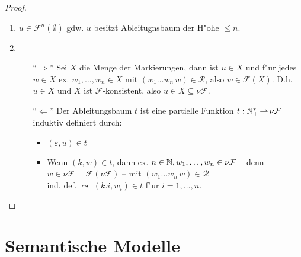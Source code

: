 \documentclass[12pt,a4paper,final]{article}
\begin{document}
\begin{proof} \
  \begin{enumerate}
  \item $u \in \mathcal{F}^n(\emptyset)$ gdw. $u$ besitzt Ableitugnsbaum der H"ohe $\le n$.
  \item 
    \begin{itemize}
    \item[``$\Rightarrow$'']
      Sei $X$ die Menge der Markierungen, dann ist $u \in X$ und f"ur jedes $w \in X$ ex.
      $w_1,\ldots,w_n \in X$ mit $(w_1 \ldots w_n\,w) \in \mathcal{R}$, also
      $w \in \mathcal{F}(X)$. D.h.\xspace $u \in X$ und $X$ ist $\mathcal{F}$-konsistent, also
      $u \in X \subseteq \nu \mathcal{F}$.
    \item[``$\Leftarrow$'']
      Der Ableitungsbaum $t$ ist eine partielle Funktion $t: \mathbb N_+^* \operatorname{\rightharpoonup} \nu\mathcal{F}$ induktiv definiert
      durch:
      \begin{itemize}
      \item $(\varepsilon,u) \in t$
      \item Wenn $(k,w) \in t$, dann ex. $n\in\mathbb N,w_1,\ldots,w_n \in \nu\mathcal{F}$ --
        denn $w \in \nu\mathcal{F} = \mathcal{F}(\nu\mathcal{F})$ -- mit
        $(w_1 \ldots w_n\,w) \in \mathcal{R}$ \\
        ind. def. $\leadsto$ $(k.i,w_i) \in t$ f"ur $i=1,\ldots,n$.
      \end{itemize}
    \end{itemize}
  \end{enumerate}
\end{proof}



\section{Semantische Modelle}
\label{sec:Semantische_Modelle}
\end{document}
